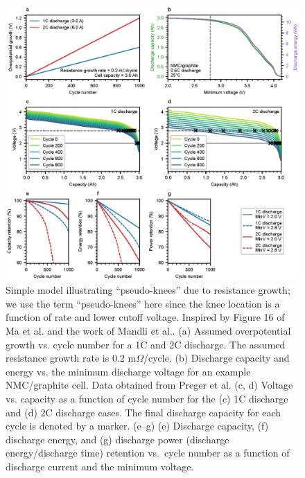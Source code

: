 \documentclass[journal=jpclcd,manuscript=article]{achemso}
\begin{document}
\begin{figure}[p]
\centering
\includegraphics[scale = 1]{figures/resistance_growth_knee_2.eps}
\caption{Simple model illustrating ``pseudo-knees'' due to resistance growth; we use the term ``pseudo-knees'' here since the knee location is a function of rate and lower cutoff voltage. Inspired by Figure 16 of Ma et al.\cite{ma_editors_2019} and the work of Mandli et al.\cite{mandli_analysis_2019}. (a) Assumed overpotential growth vs. cycle number for a 1C and 2C discharge. The assumed resistance growth rate is 0.2 m$\Omega$/cycle. (b) Discharge capacity and energy vs. the minimum discharge voltage for an example NMC/graphite cell. Data obtained from Preger et al.\cite{preger_degradation_2020} (c, d) Voltage vs. capacity as a function of cycle number for the (c) 1C discharge and (d) 2C discharge cases. The final discharge capacity for each cycle is denoted by a marker. (e--g) (e) Discharge capacity, (f) discharge energy, and (g) discharge power (discharge energy/discharge time) retention vs.\ cycle number as a function of discharge current and the minimum voltage.
}
\label{fig:dcr_knee}
\end{figure}
\end{document}
